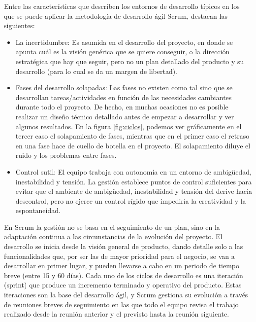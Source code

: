 Entre las características que describen los entornos de desarrollo típicos en los que se puede aplicar la metodología de desarrollo ágil Scrum, destacan las siguientes:

\begin{itemize}
\item La incertidumbre: Es asumida en el desarrollo del proyecto, en donde se apunta cuál es la visión genérica que se quiere conseguir, o la dirección estratégica que hay que seguir, pero no un plan detallado del producto y su desarrollo (para lo cual se da un margen de libertad).
\item Fases del desarrollo solapadas: Las fases no existen como tal sino que se desarrollan tareas/actividades en función de las necesidades cambiantes durante todo el proyecto. De hecho, en muchas ocasiones no es posible realizar un diseño técnico detallado antes de empezar a desarrollar y ver algunos resultados. En la figura \ref{fig:ciclos}, podemos ver gráficamente en el tercer caso el solapamiento de fases, mientras que en el primer caso el retraso en una fase hace de cuello de botella en el proyecto. El solapamiento diluye el ruido y los problemas entre fases.
\item Control sutil: El equipo trabaja con autonomía en un entorno de ambigüedad, inestabilidad y tensión. La gestión establece puntos de control suficientes para evitar que el ambiente de ambigüedad, inestabilidad y tensión del derive hacia descontrol, pero no ejerce un control rígido que impediría la creatividad y la espontaneidad.
\end{itemize}

En Scrum la gestión no se basa en el seguimiento de un plan, sino en la adaptación continua a las circunstancias de la evolución del proyecto. El desarrollo se inicia desde la visión general de producto, dando detalle  solo a las funcionalidades que, por ser las de mayor prioridad para el negocio, se van a desarrollar en primer lugar, y pueden llevarse a cabo en un periodo de tiempo breve (entre 15 y 60 días). Cada uno de los ciclos de desarrollo es una iteración (sprint) que produce un incremento terminado y operativo del producto. Estas iteraciones son la base del desarrollo ágil, y Scrum gestiona su evolución a través de reuniones breves de seguimiento en las que todo el equipo revisa el trabajo realizado desde la reunión anterior y el previsto hasta la reunión siguiente.

